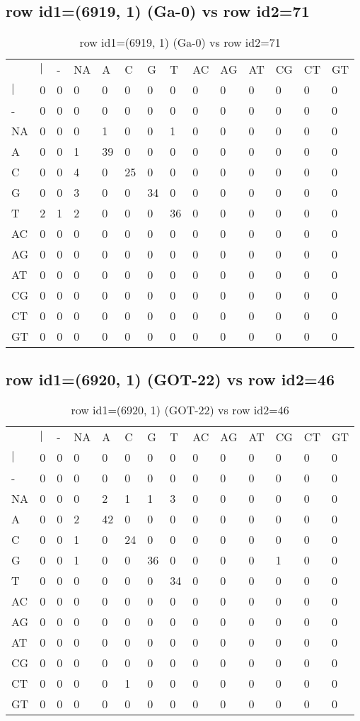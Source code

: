 \subsection{row id1=(6919, 1) (Ga-0) vs row id2=71}
\begin{center}
\begin{longtable}{|l|l|l|l|l|l|l|l|l|l|l|l|l|l|}
\caption{row id1=(6919, 1) (Ga-0) vs row id2=71} \label{table_dm100}\\
\hline
\\
\hline
&$|$&-&NA&A&C&G&T&AC&AG&AT&CG&CT&GT\\
$|$&0&0&0&0&0&0&0&0&0&0&0&0&0\\
-&0&0&0&0&0&0&0&0&0&0&0&0&0\\
NA&0&0&0&1&0&0&1&0&0&0&0&0&0\\
A&0&0&1&39&0&0&0&0&0&0&0&0&0\\
C&0&0&4&0&25&0&0&0&0&0&0&0&0\\
G&0&0&3&0&0&34&0&0&0&0&0&0&0\\
T&2&1&2&0&0&0&36&0&0&0&0&0&0\\
AC&0&0&0&0&0&0&0&0&0&0&0&0&0\\
AG&0&0&0&0&0&0&0&0&0&0&0&0&0\\
AT&0&0&0&0&0&0&0&0&0&0&0&0&0\\
CG&0&0&0&0&0&0&0&0&0&0&0&0&0\\
CT&0&0&0&0&0&0&0&0&0&0&0&0&0\\
GT&0&0&0&0&0&0&0&0&0&0&0&0&0\\
\hline
\end{longtable}
\end{center}

\subsection{row id1=(6920, 1) (GOT-22) vs row id2=46}
\begin{center}
\begin{longtable}{|l|l|l|l|l|l|l|l|l|l|l|l|l|l|}
\caption{row id1=(6920, 1) (GOT-22) vs row id2=46} \label{table_dm102}\\
\hline
\\
\hline
&$|$&-&NA&A&C&G&T&AC&AG&AT&CG&CT&GT\\
$|$&0&0&0&0&0&0&0&0&0&0&0&0&0\\
-&0&0&0&0&0&0&0&0&0&0&0&0&0\\
NA&0&0&0&2&1&1&3&0&0&0&0&0&0\\
A&0&0&2&42&0&0&0&0&0&0&0&0&0\\
C&0&0&1&0&24&0&0&0&0&0&0&0&0\\
G&0&0&1&0&0&36&0&0&0&0&1&0&0\\
T&0&0&0&0&0&0&34&0&0&0&0&0&0\\
AC&0&0&0&0&0&0&0&0&0&0&0&0&0\\
AG&0&0&0&0&0&0&0&0&0&0&0&0&0\\
AT&0&0&0&0&0&0&0&0&0&0&0&0&0\\
CG&0&0&0&0&0&0&0&0&0&0&0&0&0\\
CT&0&0&0&0&1&0&0&0&0&0&0&0&0\\
GT&0&0&0&0&0&0&0&0&0&0&0&0&0\\
\hline
\end{longtable}
\end{center}

